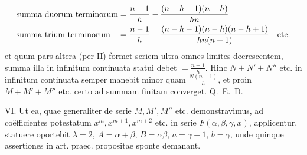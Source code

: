 \[
\begin{array}{@{}l@{\;}l@{}}
\text{summa duorum terminorum}&=\displaystyle\frac{n-1}{h}-\frac{(n-h-1)(n-h)}{hn}\\[7pt]
\text{summa trium terminorum}&=\displaystyle\frac{n-1}{h}-\frac{(n-h-1)(n-h)(n-h+1)}{hn(n+1)}\quad\text{etc.}
\end{array}
\]
et quum pars altera (per II) formet seriem ultra omnes limites decrescentem,
summa illa in infinitum continuata statui debet $=\frac{n-1}{h}$. Hinc $N+N'+N''$ etc.
in infinitum continuata semper manebit minor quam $\frac{N(n-1)}{h}$, et proin $M+M'+M''$
etc. certo ad summam finitam converget. Q.~E.~D.

VI. Ut ea, quae generaliter de serie $M,M',M''$ etc. demonstravimus, ad
coëfficientes potestatum $x^m,x^{m+1},x^{m+2}$ etc. in serie $F(\alpha,\beta,\gamma,x)$, applicentur,
statuere oportebit $\lambda=2$, $A=\alpha+\beta$, $B=\alpha\beta$, $a=\gamma+1$, $b=\gamma$, unde quinque assertiones in art. praec. propositae sponte demanant.

